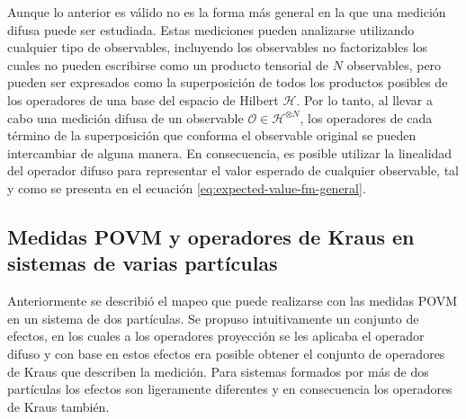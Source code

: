 Aunque lo anterior es válido no es la forma más general en la que una medición
difusa puede ser estudiada. Estas mediciones pueden analizarse utilizando
cualquier tipo de observables, incluyendo los observables no factorizables los
cuales no pueden escribirse como un producto tensorial de $N$ observables, pero
pueden ser expresados como la superposición de todos los productos posibles de 
los operadores de una base del espacio de Hilbert $\mathcal{H}$. Por lo tanto, al llevar a cabo una medición difusa de un observable  $\mathcal{O} \in \mathcal{H}^{\otimes N}$, los operadores de cada término de la superposición que conforma el observable original se pueden intercambiar de alguna manera. En consecuencia, es posible  utilizar la linealidad del operador difuso para representar el valor esperado de cualquier observable, tal y como se presenta en el ecuación
{\eqref{eq:expected-value-fm-general}}.


\subsection{Medidas POVM y operadores de Kraus en sistemas de varias partículas} %

Anteriormente se describió el mapeo que puede realizarse con las medidas POVM
en un sistema de dos partículas. Se propuso intuitivamente un conjunto de
efectos, en los cuales a los operadores proyección se les aplicaba el operador
difuso y con base en estos efectos era posible obtener el conjunto de
operadores de Kraus que describen la medición. Para sistemas formados por más
de dos partículas los efectos son ligeramente diferentes y en consecuencia los
operadores de Kraus también.

